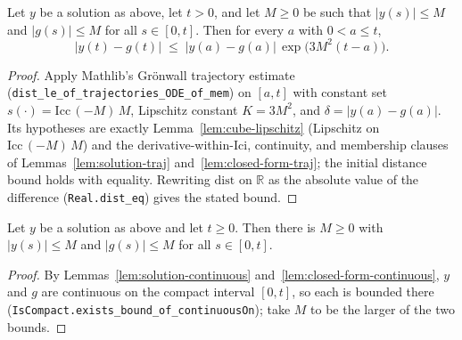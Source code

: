 \begin{lemma}
    \label{lem:gronwall-bound}
    \leanok
    Let $y$ be a solution as above, let $t > 0$, and let $M \ge 0$ be such that
    $|y(s)| \le M$ and $|g(s)| \le M$ for all $s \in [0,t]$. Then for every $a$
    with $0 < a \le t$,
    \[
        \bigl| y(t) - g(t) \bigr|
          \;\le\; \bigl| y(a) - g(a) \bigr|\,\exp\!\bigl(3M^2 (t - a)\bigr).
    \]
\end{lemma}
\begin{proof}
    Apply Mathlib's Gr\"onwall trajectory estimate
    (\texttt{dist\_le\_of\_trajectories\_ODE\_of\_mem}) on $[a,t]$ with constant
    set $s(\cdot) = \mathrm{Icc}\,(-M)\,M$, Lipschitz constant $K = 3M^2$, and
    $\delta = |y(a) - g(a)|$. Its hypotheses are exactly
    Lemma~\ref{lem:cube-lipschitz} (Lipschitz on $\mathrm{Icc}\,(-M)\,M$) and the
    derivative-within-$\mathrm{Ici}$, continuity, and membership clauses of
    Lemmas~\ref{lem:solution-traj} and~\ref{lem:closed-form-traj}; the initial
    distance bound holds with equality. Rewriting $\mathrm{dist}$ on $\mathbb{R}$
    as the absolute value of the difference (\texttt{Real.dist\_eq}) gives the
    stated bound.
\end{proof}

\begin{lemma}
    \label{lem:compact-bound}
    \leanok
    Let $y$ be a solution as above and let $t \ge 0$. Then there is $M \ge 0$
    with $|y(s)| \le M$ and $|g(s)| \le M$ for all $s \in [0,t]$.
\end{lemma}
\begin{proof}
    By Lemmas~\ref{lem:solution-continuous} and~\ref{lem:closed-form-continuous},
    $y$ and $g$ are continuous on the compact interval $[0,t]$, so each is
    bounded there (\texttt{IsCompact.exists\_bound\_of\_continuousOn}); take $M$
    to be the larger of the two bounds.
\end{proof}

